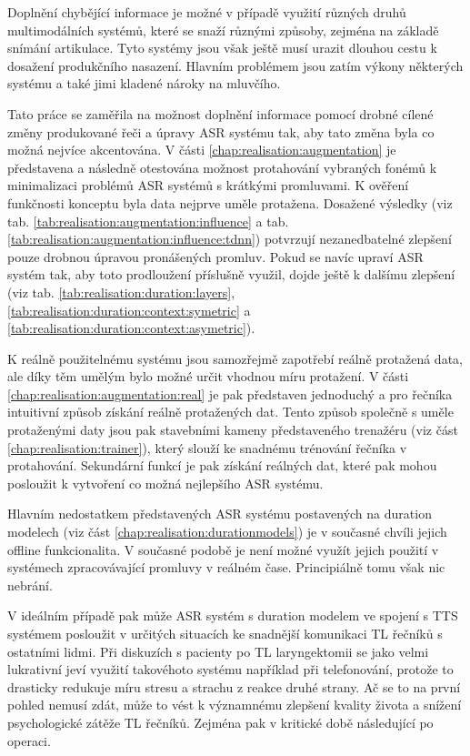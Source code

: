 Doplnění chybějící informace je možné v případě využití různých druhů multimodálních systémů, které se snaží různými způsoby, zejména na základě snímání artikulace. Tyto systémy jsou však ještě musí urazit dlouhou cestu k dosažení produkčního nasazení. Hlavním problémem jsou zatím výkony některých systému a také jimi kladené nároky na mluvčího.

Tato práce se zaměřila na možnost doplnění informace pomocí drobné cílené změny produkované řeči a úpravy ASR systému tak, aby tato změna byla co možná nejvíce akcentována. V části \ref{chap:realisation:augmentation} je představena a následně otestována možnost protahování vybraných fonémů k minimalizaci problémů ASR systémů s krátkými promluvami. K ověření funkčnosti konceptu byla data nejprve uměle protažena. Dosažené výsledky (viz tab. \ref{tab:realisation:augmentation:influence} a tab. \ref{tab:realisation:augmentation:influence:tdnn}) potvrzují nezanedbatelné zlepšení pouze drobnou úpravou pronášených promluv. Pokud se navíc upraví ASR systém tak, aby toto prodloužení příslušně využil, dojde ještě k dalšímu zlepšení (viz tab. \ref{tab:realisation:duration:layers}, \ref{tab:realisation:duration:context:symetric} a \ref{tab:realisation:duration:context:asymetric}).

K reálně použitelnému systému jsou samozřejmě zapotřebí reálně protažená data, ale díky těm umělým bylo možné určit vhodnou míru protažení. V části \ref{chap:realisation:augmentation:real} je pak představen jednoduchý a pro řečníka intuitivní způsob získání reálně protažených dat. Tento způsob společně s uměle protaženými daty jsou pak stavebními kameny představeného trenažéru (viz část \ref{chap:realisation:trainer}), který slouží ke snadnému trénování řečníka v protahování. Sekundární funkcí je pak získání reálných dat, které pak mohou posloužit k vytvoření co možná nejlepšího ASR systému.

Hlavním nedostatkem představených ASR systému postavených na duration modelech (viz část \ref{chap:realisation:durationmodels}) je v současné chvíli jejich offline funkcionalita. V současné podobě je není možné využít jejich použití v systémech zpracovávající promluvy v reálném čase. Principiálně tomu však nic nebrání.

V ideálním případě pak může ASR systém s duration modelem ve spojení s TTS systémem posloužit v určitých situacích ke snadnější komunikaci TL řečníků s ostatními lidmi. Při diskuzích s pacienty po TL laryngektomii se jako velmi lukrativní jeví využití takovéhoto systému například při telefonování, protože to drasticky redukuje míru stresu a strachu z reakce druhé strany. Ač se to na první pohled nemusí zdát, může to vést k významnému zlepšení kvality života a snížení psychologické zátěže TL řečníků. Zejména pak v kritické době následující po operaci.


